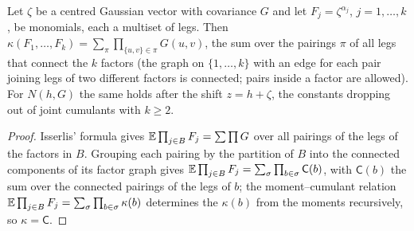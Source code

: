 \begin{lemma}\label{rot:lem:R1wick}
Let $\zeta$ be a centred Gaussian vector with covariance $G$ and let $F_j=\zeta^{\alpha_j}$, $j=1,\dots,k$, be monomials, each a multiset of legs. Then $\kappa(F_1,\dots,F_k)=\sum_\pi\prod_{\{u,v\}\in\pi}G(u,v)$, the sum over the pairings $\pi$ of all legs that connect the $k$ factors (the graph on $\{1,\dots,k\}$ with an edge for each pair joining legs of two different factors is connected; pairs inside a factor are allowed). For $N(h,G)$ the same holds after the shift $z=h+\zeta$, the constants dropping out of joint cumulants with $k\ge2$.
\end{lemma}
\begin{proof}
Isserlis' formula gives $\mathbb E\prod_{j\in B}F_j=\sum\prod G$ over all pairings of the legs of the factors in $B$. Grouping each pairing by the partition of $B$ into the connected components of its factor graph gives $\mathbb E\prod_{j\in B}F_j=\sum_\sigma\prod_{b\in\sigma}\mathsf C(b)$, with $\mathsf C(b)$ the sum over the connected pairings of the legs of $b$; the moment--cumulant relation $\mathbb E\prod_{j\in B}F_j=\sum_\sigma\prod_{b\in\sigma}\kappa(b)$ determines the $\kappa(b)$ from the moments recursively, so $\kappa=\mathsf C$.
\end{proof}

